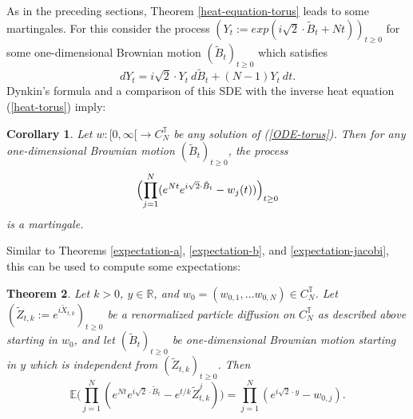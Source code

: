 \documentclass[reqno]{amsart}
\theoremstyle{plain}
\newtheorem{theorem}{Theorem}[section]
\newtheorem{corollary}[theorem]{Corollary}
\theoremstyle{definition}
\numberwithin{equation}{section}
\begin{document}
As in the preceding sections,
Theorem \ref{heat-equation-torus} leads to some martingales. For this consider the process $(Y_t:=exp( i\sqrt 2 \cdot \tilde B_t +Nt))_{t\ge0}$
for 
some one-dimensional Brownian motion
 $(\tilde B_t)_{t\ge0}$ which satisfies
 $$dY_t=  i\sqrt 2 \cdot Y_t \> d \tilde B_t +(N-1)Y_t\> dt.$$
Dynkin's formula and a  comparison of this SDE with the inverse heat equation (\ref{heat-torus})  imply:

 \begin{corollary}\label{martingale-torus}
   Let  $w:[0,\infty[\to C_N^{\mathbb T}$ be any solution  of (\ref{ODE-torus}). Then for any one-dimensional Brownian motion
       $(\tilde B_t)_{t\ge0}$, the process
$$\Bigl( \prod_{j=1}^N (e^{Nt}e^{ i\sqrt 2 \cdot \tilde B_t } -w_j(t))\Bigr)_{t\ge0}$$
   is a martingale.    
 \end{corollary}

 Similar to Theorems \ref{expectation-a}, \ref{expectation-b}, and \ref{expectation-jacobi}, this can be used to compute some expectations:

 
\begin{theorem}\label{expectation-torus}
  Let $k>0$, $y\in \mathbb R$, and  $w_0=(w_{0,1},\ldots w_{0,N} )\in C_N^{\mathbb T}$.
Let  
  $(\tilde Z_{t,k}:=e^{i\widetilde X_{t,k}})_{t\ge0}$ be a renormalized particle diffusion on   $C_N^{\mathbb T}$ as described  above starting in $w_0$, and let
 $(\tilde B_t)_{t\ge0}$ be one-dimensional Brownian motion starting in $y$ which is independent from  $(\tilde Z_{t,k})_{t\ge0}$.
Then
\begin{equation}\label{equ-expectation-torus}
\mathbb E\biggl(\prod_{j=1}^N (  e^{Nt}e^{ i\sqrt 2 \cdot \tilde B_t } - e^{t/k}\tilde Z_{t,k}^j )\biggr)= \prod_{j=1}^N (e^{ i\sqrt 2 \cdot y}-w_{0,j}).
\end{equation}
\end{theorem}
\end{document}
